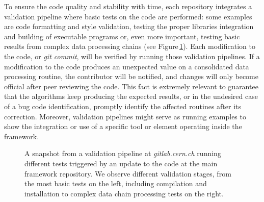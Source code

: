

To ensure the code quality and stability with time, each repository integrates a validation pipeline where basic tests on the code are performed: some examples are code formatting and style validation, testing the proper libraries integration and building of executable programs or, even more important, testing basic results from complex data processing chains (see Figure\,\ref{fig:pipelines}). Each modification to the code, or \emph{git commit}, will be verified by running those validation pipelines. If a modification to the code produces an unexpected value on a consolidated data processing routine, the contributor will be notified, and changes will only become official after peer reviewing the code. This fact is extremely relevant to guarantee that the algorithms keep producing the expected results, or in the undesired case of a bug code identification, promptly identify the affected routines after its correction. Moreover, validation pipelines might serve as running examples to show the integration or use of a specific tool or element operating inside the framework.

\begin{figure}[h]
  \centering
	\caption{A snapshot from a validation pipeline at \emph{gitlab.cern.ch} running different tests triggered by an update to the code at the main framework repository. We observe different validation stages, from the most basic tests on the left, including compilation and installation to complex data chain processing tests on the right.}\label{fig:pipelines}
\end{figure}
